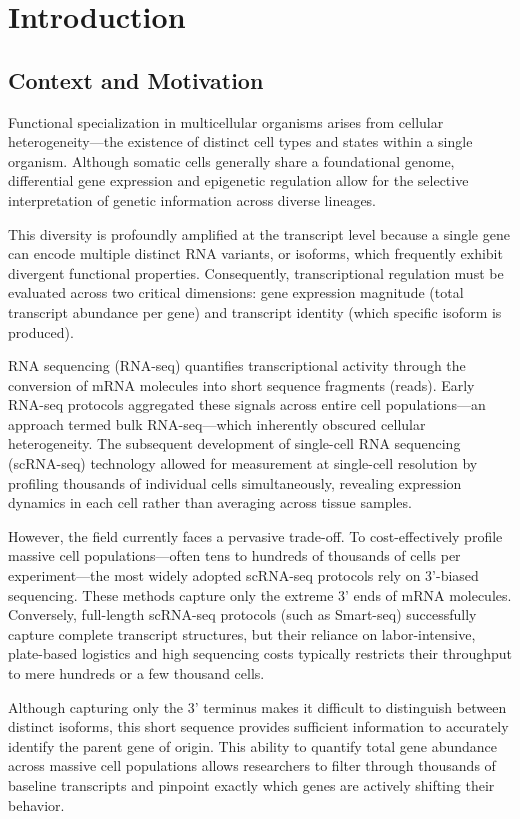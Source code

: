 \chapter{Introduction}

\section{Context and Motivation}
\setlength{\parskip}{0.5\baselineskip}
Functional specialization in multicellular organisms arises from cellular heterogeneity—the existence of distinct cell types and states within a single organism. Although somatic cells generally share a foundational genome, differential gene expression and epigenetic regulation allow for the selective interpretation of genetic information across diverse lineages. 

This diversity is profoundly amplified at the transcript level because a single gene can encode multiple distinct RNA variants, or isoforms, which frequently exhibit divergent functional properties. Consequently, transcriptional regulation must be evaluated across two critical dimensions: gene expression magnitude (total transcript abundance per gene) and transcript identity (which specific isoform is produced).

RNA sequencing (RNA-seq) quantifies transcriptional activity through the conversion of mRNA molecules into short sequence fragments (reads). Early RNA-seq protocols aggregated these signals across entire cell populations—an approach termed bulk RNA-seq—which inherently obscured cellular heterogeneity. The subsequent development of single-cell RNA sequencing (scRNA-seq) technology allowed for measurement at single-cell resolution by profiling thousands of individual cells simultaneously, revealing expression dynamics in each cell rather than averaging across tissue samples.

However, the field currently faces a pervasive trade-off. To cost-effectively profile massive cell populations—often tens to hundreds of thousands of cells per experiment—the most widely adopted scRNA-seq protocols rely on 3'-biased sequencing. These methods capture only the extreme 3' ends of mRNA molecules. Conversely, full-length scRNA-seq protocols (such as Smart-seq) successfully capture complete transcript structures, but their reliance on labor-intensive, plate-based logistics and high sequencing costs typically restricts their throughput to mere hundreds or a few thousand cells.

Although capturing only the 3' terminus makes it difficult to distinguish between distinct isoforms, this short sequence provides sufficient information to accurately identify the parent gene of origin. This ability to quantify total gene abundance across massive cell populations allows researchers to filter through thousands of baseline transcripts and pinpoint exactly which genes are actively shifting their behavior.

